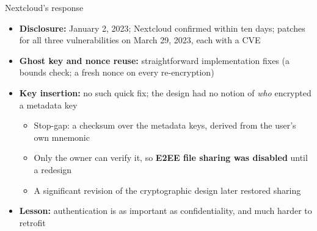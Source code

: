 \ifdefined\PRESENTATION\else\PassOptionsToClass{handout}{beamer}\fi\documentclass[aspectratio=169, lualatex]{beamer}
\begin{document}
\begin{frame}{Nextcloud's response}
	\begin{itemize}
		\item \textbf{Disclosure:} January 2, 2023; Nextcloud confirmed within ten days; patches for all three vulnerabilities on March 29, 2023, each with a CVE
		\item \textbf{Ghost key and nonce reuse:} straightforward implementation fixes (a bounds check; a fresh nonce on every re-encryption)
		\item \textbf{Key insertion:} no such quick fix; the design had no notion of \textit{who} encrypted a metadata key
		      \begin{itemize}
			      \item Stop-gap: a checksum over the metadata keys, derived from the user's own mnemonic
			      \item Only the owner can verify it, so \textbf{E2EE file sharing was disabled} until a redesign
			      \item A significant revision of the cryptographic design later restored sharing
		      \end{itemize}
		\item \textbf{Lesson:} authentication is as important as confidentiality, and much harder to retrofit
	\end{itemize}
\end{frame}
\end{document}

